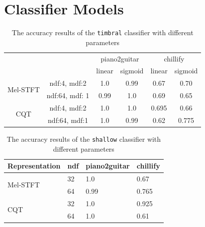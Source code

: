 \documentclass[12pt,a4paper,]{report}
\begin{document}
\hypertarget{classifier-models}{%
\section{Classifier Models}\label{classifier-models}}

\begin{table}[h]
\begin{tabular}{cc|c|c|c|c|}
\cline{3-6}
                                                &                & \multicolumn{2}{c|}{piano2guitar} & \multicolumn{2}{c|}{chillify} \\ \cline{3-6} 
                                                &                & linear  & sigmoid & linear & sigmoid \\ \hline
\multicolumn{1}{|c|}{\multirow{2}{*}{Mel-STFT}} & ndf:4, mdf:2   & 1.0     & 0.99    & 0.67   & 0.70    \\ \cline{2-6} 
\multicolumn{1}{|c|}{}                          & ndf:64, mdf: 1 & 0.99    & 1.0     & 0.69   & 0.65    \\ \hline
\multicolumn{1}{|c|}{\multirow{2}{*}{CQT}}      & ndf:4, mdf:2   & 1.0     & 1.0     & 0.695   & 0.66    \\ \cline{2-6} 
\multicolumn{1}{|c|}{}                          & ndf:64, mdf:1  & 1.0     & 0.99    & 0.62   & 0.775    \\ \hline
\end{tabular}
\centering
\caption{The accuracy results of the \texttt{timbral} classifier with different parameters} \label{tab:timbral}
\end{table}

\begin{table}[h]
\begin{tabular}{llll}
\hline
Representation            & ndf & piano2guitar & chillify \\ \hline
\multirow{2}{*}{Mel-STFT} & 32  & 1.0          & 0.67     \\
                          & 64  & 0.99         & 0.765     \\
\multirow{2}{*}{CQT}      & 32  & 1.0          & 0.925     \\
                          & 64  & 1.0          & 0.61     \\ \hline
\end{tabular}
\centering
\caption{The accuracy results of the \texttt{shallow} classifier with different parameters} \label{tab:shallow}
\end{table}
\end{document}
